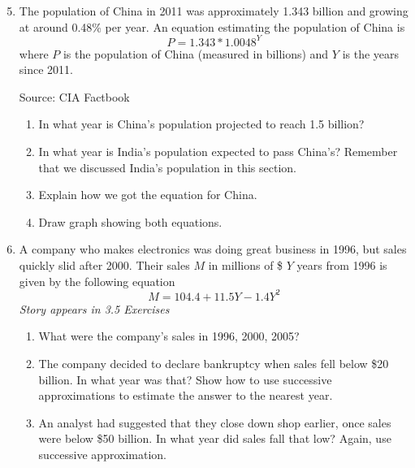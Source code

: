 \begin{enumerate} 
\setcounter{enumi}{4}

\item  The population of China in 2011 was approximately 1.343 billion and growing at around 0.48\% per year.  An equation estimating the population of China is
$$P = 1.343 \ast 1.0048^Y$$ where $P$ is the population of China (measured in billions) and $Y$ is the years since 2011. \hfill \begin{footnotesize} Source:  CIA Factbook \end{footnotesize}
\begin{enumerate}
\item In what year is China's population projected to reach 1.5 billion?
\item In what year is India's population expected to pass China's?  Remember that we discussed India's population in this section.
 \item Explain how we got the equation for China.
 \item Draw graph showing both equations.
\end{enumerate} 

\item A company who makes electronics was doing great business in 1996, but sales quickly slid after 2000.  Their sales $M$ in millions of \$ $Y$ years from 1996 is given by the following equation $$M = 104.4+11.5Y-1.4Y^2$$
\hfill \emph{Story appears in 3.5 Exercises}
\begin{enumerate}
\item What were the company's sales in 1996, 2000, 2005?
\item The company decided to declare bankruptcy when sales fell below \$20 billion.  In what year was that?  Show how to use successive approximations to estimate the answer to the nearest year. 
\item An analyst had suggested that they close down shop earlier, once sales were below \$50 billion.  In what year did sales fall that low? Again, use successive approximation.
\end{enumerate} 


\end{enumerate}
